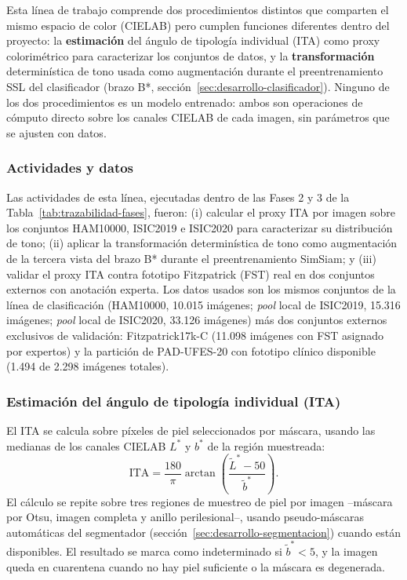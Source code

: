 Esta línea de trabajo comprende dos procedimientos distintos que comparten el mismo espacio de color (CIELAB) pero cumplen funciones diferentes dentro del proyecto: la \textbf{estimación} del ángulo de tipología individual (ITA) como proxy colorimétrico para caracterizar los conjuntos de datos, y la \textbf{transformación} determinística de tono usada como augmentación durante el preentrenamiento SSL del clasificador (brazo B*, sección~\ref{sec:desarrollo-clasificador}). Ninguno de los dos procedimientos es un modelo entrenado: ambos son operaciones de cómputo directo sobre los canales CIELAB de cada imagen, sin parámetros que se ajusten con datos.

\subsubsection{Actividades y datos}

Las actividades de esta línea, ejecutadas dentro de las Fases 2 y 3 de la Tabla~\ref{tab:trazabilidad-fases}, fueron: (i) calcular el proxy ITA por imagen sobre los conjuntos HAM10000, ISIC2019 e ISIC2020 para caracterizar su distribución de tono; (ii) aplicar la transformación determinística de tono como augmentación de la tercera vista del brazo B* durante el preentrenamiento SimSiam; y (iii) validar el proxy ITA contra fototipo Fitzpatrick (FST) real en dos conjuntos externos con anotación experta. Los datos usados son los mismos conjuntos de la línea de clasificación (HAM10000, 10.015 imágenes; \textit{pool} local de ISIC2019, 15.316 imágenes; \textit{pool} local de ISIC2020, 33.126 imágenes) más dos conjuntos externos exclusivos de validación: Fitzpatrick17k-C (11.098 imágenes con FST asignado por expertos) y la partición de PAD-UFES-20 con fototipo clínico disponible (1.494 de 2.298 imágenes totales).

\subsubsection{Estimación del ángulo de tipología individual (ITA)}

El ITA se calcula sobre píxeles de piel seleccionados por máscara, usando las medianas de los canales CIELAB $L^*$ y $b^*$ de la región muestreada:
\begin{equation}
 \mathrm{ITA}=\frac{180}{\pi}\arctan\!\left(\frac{\widetilde L^*-50}{\widetilde b^*}\right).
\end{equation}
El cálculo se repite sobre tres regiones de muestreo de piel por imagen --máscara por Otsu, imagen completa y anillo perilesional--, usando pseudo-máscaras automáticas del segmentador (sección~\ref{sec:desarrollo-segmentacion}) cuando están disponibles. El resultado se marca como indeterminado si $\widetilde b^*<5$, y la imagen queda en cuarentena cuando no hay piel suficiente o la máscara es degenerada.


